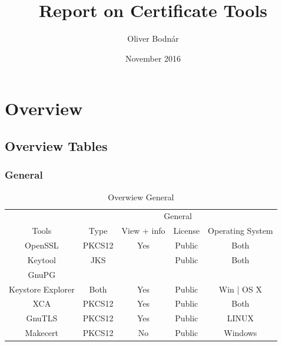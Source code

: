 \documentclass[10pt, a4paper]{report}
\title{Report on Certificate Tools}
\author{Oliver Bodnár}
\date{November 2016}
\begin{document}
\maketitle

\tableofcontents

\newpage

\part{Overview}

\chapter{Overview Tables}

\section{General}
\begin{table}[h!]
\centering
\caption{Overwiew General}
\label{my-label}
\begin{adjustbox}{max width=\textwidth}
\begin{tabular}{|c|c|c|c|c|}
\hline
                        & \multicolumn{4}{c|}{General}                                                                               \\ \cline{2-5} 
\multirow{-2}{*}{Tools} & Type   & View + info                                        & License & Operating System                   \\ \hline
OpenSSL                 & PKCS12 & \cellcolor[HTML]{34FF34}Yes                        & Public  & \cellcolor[HTML]{34FF34}Both       \\ \hline
Keytool                 & JKS    & \cellcolor[HTML]{34FF34}{\color[HTML]{000000} Yes} & Public  & \cellcolor[HTML]{34FF34}Both       \\ \hline
GnuPG                   &        &                                                    &         &                                    \\ \hline
Keystore Explorer       & Both   & \cellcolor[HTML]{34FF34}Yes                        & Public  & \cellcolor[HTML]{FFC702}Win | OS X \\ \hline
XCA                     & PKCS12 & \cellcolor[HTML]{34FF34}Yes                        & Public  & \cellcolor[HTML]{34FF34}Both       \\ \hline
GnuTLS                  & PKCS12 & \cellcolor[HTML]{34FF34}Yes                        & Public  & \cellcolor[HTML]{FFC702}LINUX      \\ \hline
Makecert                & PKCS12 & \cellcolor[HTML]{FE0000}No			      & Public  & \cellcolor[HTML]{FFC702}Windows    \\ \hline
\end{tabular}
\end{adjustbox}
\end{table}
\end{document}
